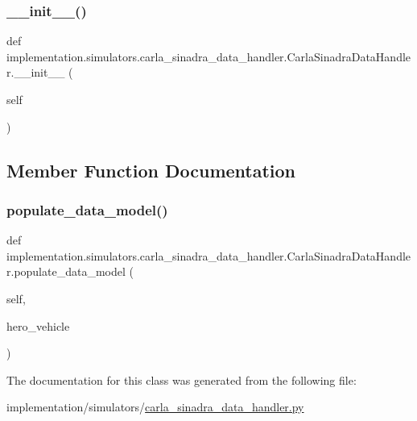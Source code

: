 \subsubsection{\texorpdfstring{\+\_\+\+\_\+init\+\_\+\+\_\+()}{\_\_init\_\_()}}
{\footnotesize\ttfamily def implementation.\+simulators.\+carla\+\_\+sinadra\+\_\+data\+\_\+handler.\+Carla\+Sinadra\+Data\+Handler.\+\_\+\+\_\+init\+\_\+\+\_\+ (\begin{DoxyParamCaption}\item[{}]{self }\end{DoxyParamCaption})}



\subsection{Member Function Documentation}
\mbox{\label{classimplementation_1_1simulators_1_1carla__sinadra__data__handler_1_1_carla_sinadra_data_handler_aa506562e73fc5609b024ea59e253943a}} 
\subsubsection{\texorpdfstring{populate\+\_\+data\+\_\+model()}{populate\_data\_model()}}
{\footnotesize\ttfamily def implementation.\+simulators.\+carla\+\_\+sinadra\+\_\+data\+\_\+handler.\+Carla\+Sinadra\+Data\+Handler.\+populate\+\_\+data\+\_\+model (\begin{DoxyParamCaption}\item[{}]{self,  }\item[{}]{hero\+\_\+vehicle }\end{DoxyParamCaption})}



The documentation for this class was generated from the following file\+:\begin{DoxyCompactItemize}
\item 
implementation/simulators/\hyperlink{carla__sinadra__data__handler_8py}{carla\+\_\+sinadra\+\_\+data\+\_\+handler.\+py}\end{DoxyCompactItemize}
